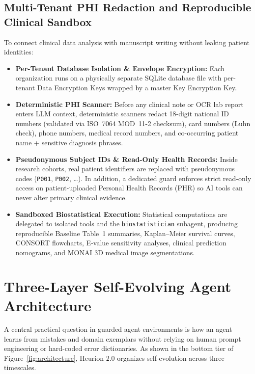 \documentclass[11pt,a4paper]{article}
\begin{document}
\subsection{Multi-Tenant PHI Redaction and Reproducible Clinical Sandbox}
To connect clinical data analysis with manuscript writing without leaking patient identities:
\begin{itemize}[leftmargin=1.5em,itemsep=2pt]
  \item \textbf{Per-Tenant Database Isolation \& Envelope Encryption:} Each organization runs on a physically separate SQLite database file with per-tenant Data Encryption Keys wrapped by a master Key Encryption Key.
  \item \textbf{Deterministic PHI Scanner:} Before any clinical note or OCR lab report enters LLM context, deterministic scanners redact 18-digit national ID numbers (validated via ISO~7064 MOD~11-2 checksum), card numbers (Luhn check), phone numbers, medical record numbers, and co-occurring patient name + sensitive diagnosis phrases.
  \item \textbf{Pseudonymous Subject IDs \& Read-Only Health Records:} Inside research cohorts, real patient identifiers are replaced with pseudonymous codes (\texttt{P001}, \texttt{P002}, \dots). In addition, a dedicated guard enforces strict read-only access on patient-uploaded Personal Health Records (PHR) so AI tools can never alter primary clinical evidence.
  \item \textbf{Sandboxed Biostatistical Execution:} Statistical computations are delegated to isolated tools and the \texttt{biostatistician} subagent, producing reproducible Baseline Table~1 summaries, Kaplan--Meier survival curves, CONSORT flowcharts, E-value sensitivity analyses, clinical prediction nomograms, and MONAI 3D medical image segmentations.
\end{itemize}

\section{Three-Layer Self-Evolving Agent Architecture}
\label{sec:evolution}

A central practical question in guarded agent environments is how an agent learns from mistakes and domain exemplars without relying on human prompt engineering or hard-coded error dictionaries. As shown in the bottom tier of Figure~\ref{fig:architecture}, Heurion 2.0 organizes self-evolution across three timescales.
\end{document}
